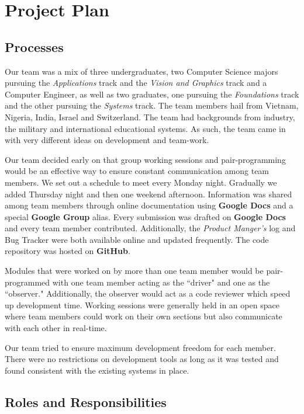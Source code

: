\documentclass[12pt]{report}
\begin{document}
\chapter{Project Plan}

\section{Processes}

Our team was a mix of three undergraduates, two Computer Science majors pursuing the \textit{Applications} track and the \textit{Vision and Graphics} track and a Computer Engineer, as well as two graduates, one pursuing the \textit{Foundations} track and the other pursuing the \textit{Systems} track. The team members hail from Vietnam, Nigeria, India, Israel and Switzerland. The team had backgrounds from industry, the military and international educational systems. As such, the team came in with very different ideas on development and team-work.

Our team decided early on that group working sessions and pair-programming would be an effective way to ensure constant communication among team members. We set out a schedule to meet every Monday night. Gradually we added Thursday night and then one weekend afternoon. Information was shared among team members through online documentation using \textbf{Google Docs} and a special \textbf{Google Group} alias. Every submission was drafted on \textbf{Google Docs} and every team member contributed. Additionally, the \textit{Product Manger's} log and Bug Tracker were both available online and updated frequently. The code repository was hosted on \textbf{GitHub}. 

Modules that were worked on by more than one team member would be pair-programmed with one team member acting as the ``driver" and one as the ``observer." Additionally, the observer would act as a code reviewer which speed up development time. Working sessions were generally held in an open space where team members could work on their own sections but also communicate with each other in real-time.

Our team tried to ensure maximum development freedom for each member. There were no restrictions on development tools as long as it was tested and found consistent with the existing systems in place. 

\section{Roles and Responsibilities}
\end{document}
